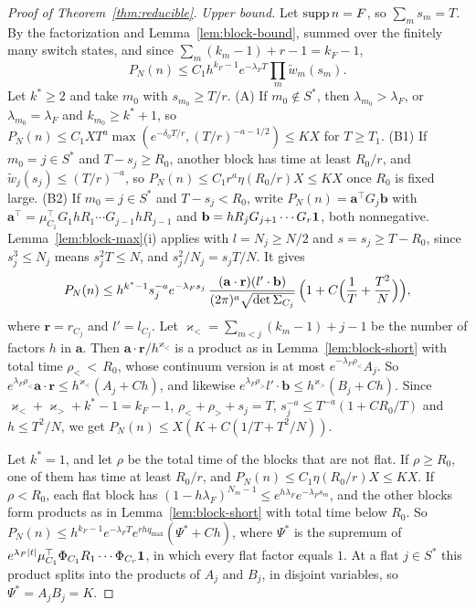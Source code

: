 \begin{proof}[Proof of Theorem~\ref{thm:reducible}]
\emph{Upper bound.} Let $\operatorname{supp} n=F$, so $\sum_ms_m=T$. By the factorization and
Lemma~\ref{lem:block-bound}, summed over the finitely many switch states, and since
$\sum_m(k_m-1)+r-1=k_F-1$,
\[
P_N(n)\le C_1h^{k_F-1}e^{-\lambda_FT}\prod_m\tilde w_m(s_m).
\]
Let $k^*\ge2$ and take $m_0$ with $s_{m_0}\ge T/r$. (A) If $m_0\notin S^*$, then
$\lambda_{m_0}>\lambda_F$, or $\lambda_{m_0}=\lambda_F$ and $k_{m_0}\ge k^*+1$, so
$P_N(n)\le C_1XT^a\max(e^{-\delta_0T/r},(T/r)^{-a-1/2})\le KX$ for $T\ge T_1$. (B1) If $m_0=j\in S^*$
and $T-s_j\ge R_0$, another block has time at least $R_0/r$, and $\tilde w_j(s_j)\le(T/r)^{-a}$, so
$P_N(n)\le C_1r^a\eta(R_0/r)X\le KX$ once $R_0$ is fixed large. (B2) If $m_0=j\in S^*$ and
$T-s_j<R_0$, write $P_N(n)=\mathbf a^\top G_j\mathbf b$ with
$\mathbf a^\top=\mu_{C_1}^\top G_1hR_1\cdots G_{j-1}hR_{j-1}$ and $\mathbf b=hR_jG_{j+1}\cdots G_r\mathbf{1}$,
both nonnegative. Lemma~\ref{lem:block-max}(i) applies with $l=N_j\ge N/2$ and $s=s_j\ge T-R_0$,
since $s_j^3\le N_j$ means $s_j^2T\le N$, and $s_j^2/N_j=s_jT/N$. It gives
\[
P_N(n)\le h^{k^*-1}s_j^{-a}e^{-\lambda_Fs_j}\,\frac{(\mathbf a\cdot\mathbf r)(l'\cdot\mathbf b)}{(2\pi)^a\sqrt{\det\Sigma_{C_j}}}\,
\Bigl(1+C\Bigl(\frac1T+\frac{T^2}N\Bigr)\Bigr),
\]
where $\mathbf r=r_{C_j}$ and $l'=l_{C_j}$. Let $\varkappa_<=\sum_{m<j}(k_m-1)+j-1$ be the number of factors $h$ in $\mathbf a$. Then
$\mathbf a\cdot\mathbf r/h^{\varkappa_<}$ is a product as in Lemma~\ref{lem:block-short} with total time
$\rho_<\,<\,R_0$, whose continuum version is at most $e^{-\lambda_F\rho_<}A_j$. So
$e^{\lambda_F\rho_<}\mathbf a\cdot\mathbf r\le h^{\varkappa_<}(A_j+Ch)$, and likewise
$e^{\lambda_F\rho_>}l'\cdot\mathbf b\le h^{\varkappa_>}(B_j+Ch)$. Since
$\varkappa_<+\varkappa_>+k^*-1=k_F-1$, $\rho_<+\rho_>+s_j=T$, $s_j^{-a}\le T^{-a}(1+CR_0/T)$ and
$h\le T^2/N$, we get $P_N(n)\le X(K+C(1/T+T^2/N))$.

Let $k^*=1$, and let $\rho$ be the total time of the blocks that are not flat. If $\rho\ge R_0$,
one of them has time at least $R_0/r$, and $P_N(n)\le C_1\eta(R_0/r)X\le KX$. If $\rho<R_0$, each
flat block has $(1-h\lambda_F)^{N_m-1}\le e^{h\lambda_F}e^{-\lambda_Fs_m}$, and the other blocks
form products as in Lemma~\ref{lem:block-short} with total time below $R_0$. So
$P_N(n)\le h^{k_F-1}e^{-\lambda_FT}e^{rhq_{\max}}(\Psi^*+Ch)$, where $\Psi^*$ is the supremum of
$e^{\lambda_F|t|}\mu_{C_1}^\top\Phi_{C_1}R_1\cdots\Phi_{C_r}\mathbf{1}$, in which every flat factor
equals $1$. At a flat $j\in S^*$ this product splits into the products of $A_j$ and $B_j$, in
disjoint variables, so $\Psi^*=A_jB_j=K$.


\end{proof}
